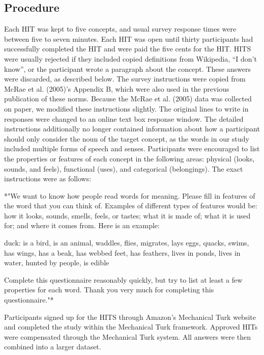\documentclass[english,,man]{apa6}
\theoremstyle{definition}
\theoremstyle{definition}
\theoremstyle{definition}
\theoremstyle{remark}
\begin{document}
\hypertarget{procedure}{%
\subsection{Procedure}\label{procedure}}

Each HIT was kept to five concepts, and usual survey response times were
between five to seven minutes. Each HIT was open until thirty
participants had successfully completed the HIT and were paid the five
cents for the HIT. HITS were usually rejected if they included copied
definitions from Wikipedia, \enquote{I don't know}, or the participant
wrote a paragraph about the concept. These answers were discarded, as
described below. The survey instructions were copied from McRae et al.
(2005)'s Appendix B, which were also used in the previous publication of
these norms. Because the McRae et al. (2005) data was collected on
paper, we modified these instructions slightly. The original lines to
write in responses were changed to an online text box response window.
The detailed instructions additionally no longer contained information
about how a participant should only consider the noun of the target
concept, as the words in our study included multiple forms of speech and
senses. Participants were encouraged to list the properties or features
of each concept in the following areas: physical (looks, sounds, and
feels), functional (uses), and categorical (belongings). The exact
instructions were as follows:

*"We want to know how people read words for meaning. Please fill in
features of the word that you can think of. Examples of different types
of features would be: how it looks, sounds, smells, feels, or tastes;
what it is made of; what it is used for; and where it comes from. Here
is an example:

duck: is a bird, is an animal, waddles, flies, migrates, lays eggs,
quacks, swims, has wings, has a beak, has webbed feet, has feathers,
lives in ponds, lives in water, hunted by people, is edible

Complete this questionnaire reasonably quickly, but try to list at least
a few properties for each word. Thank you very much for completing this
questionnaire."*

Participants signed up for the HITS through Amazon's Mechanical Turk
website and completed the study within the Mechanical Turk framework.
Approved HITs were compensated through the Mechanical Turk system. All
answers were then combined into a larger dataset.
\end{document}

